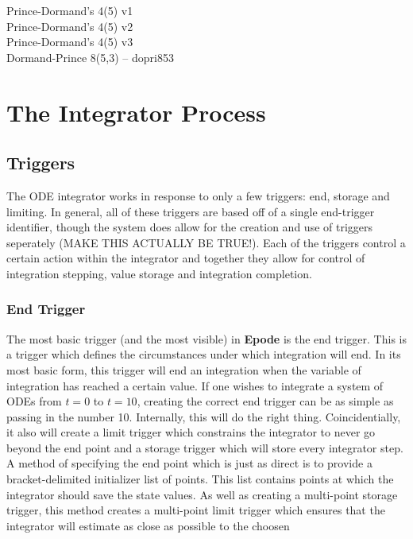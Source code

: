 \documentclass[letterpaper,10pt]{book}
\newcommand{\epode}[0]{\textbf{Epode}}
\begin{document}
    	Prince-Dormand's 4(5) v1\\
    	Prince-Dormand's 4(5) v2\\
    	Prince-Dormand's 4(5) v3\\    
    	
    	Dormand-Prince 8(5,3) -- dopri853\\	    	    	  	   
    	    	  	    

  \chapter{The Integrator Process}
    
    \section{Triggers}
      The ODE integrator works in response to only a few triggers: end, storage and limiting.  In general, all of these triggers are based off of a single end-trigger identifier, though the system does allow for the creation and use of triggers seperately (MAKE THIS ACTUALLY BE TRUE!).  Each of the triggers control a certain action within the integrator and together they allow for control of integration stepping, value storage and integration completion.
      
      \subsection{End Trigger}
	The most basic trigger (and the most visible) in \epode{} is the end trigger.  This is a trigger which defines the circumstances under which integration will end.  In its most basic form, this trigger will end an integration when the variable of integration has reached a certain value.  If one wishes to integrate a system of ODEs from $t=0$ to $t=10$, creating the correct end trigger can be as simple as passing in the number 10.  Internally, this will do the right thing.  Coincidentially, it also will create a limit trigger which constrains the integrator to never go beyond the end point and a storage trigger which will store every integrator step.  A method of specifying the end point which is just as direct is to provide a bracket-delimited initializer list of points.  This list contains points at which the integrator should save the state values.  As well as creating a multi-point storage trigger, this method creates a multi-point limit trigger which ensures that the integrator will estimate as close as possible to the choosen  
    
\end{document}
